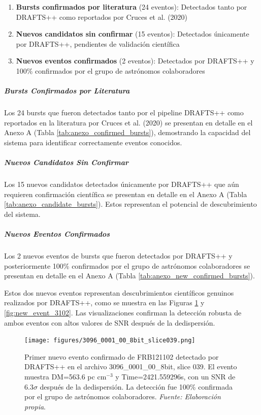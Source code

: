 \begin{enumerate}
    \item \textbf{Bursts confirmados por literatura} (24 eventos): Detectados tanto por DRAFTS++ como reportados por Cruces et al. (2020)
    \item \textbf{Nuevos candidatos sin confirmar} (15 eventos): Detectados únicamente por DRAFTS++, pendientes de validación científica
    \item \textbf{Nuevos eventos confirmados} (2 eventos): Detectados por DRAFTS++ y 100\% confirmados por el grupo de astrónomos colaboradores
\end{enumerate}

\subparagraph{Bursts Confirmados por Literatura}

Los 24 bursts que fueron detectados tanto por el pipeline DRAFTS++ como reportados en la literatura por Cruces et al. (2020) se presentan en detalle en el Anexo A (Tabla \ref{tab:anexo_confirmed_bursts}), demostrando la capacidad del sistema para identificar correctamente eventos conocidos.

\subparagraph{Nuevos Candidatos Sin Confirmar}

Los 15 nuevos candidatos detectados únicamente por DRAFTS++ que aún requieren confirmación científica se presentan en detalle en el Anexo A (Tabla \ref{tab:anexo_candidate_bursts}). Estos representan el potencial de descubrimiento del sistema.

\subparagraph{Nuevos Eventos Confirmados}

Los 2 nuevos eventos de bursts que fueron detectados por DRAFTS++ y posteriormente 100\% confirmados por el grupo de astrónomos colaboradores se presentan en detalle en el Anexo A (Tabla \ref{tab:anexo_new_confirmed_bursts}).

Estos dos nuevos eventos representan descubrimientos científicos genuinos realizados por DRAFTS++, como se muestra en las Figuras \ref{fig:new_event_3096} y \ref{fig:new_event_3102}. Las visualizaciones confirman la detección robusta de ambos eventos con altos valores de SNR después de la dedispersión.

\begin{figure}[H]
    \centering
    \texttt{[image: figures/3096\_0001\_00\_8bit\_slice039.png]}
    \caption[FRB121102: nuevo evento confirmado (3096\_...\_slice039)]{Primer nuevo evento confirmado de FRB121102 detectado por DRAFTS++ en el archivo 3096\_0001\_00\_8bit, slice 039. El evento muestra DM=563.6 pc cm$^{-3}$ y Time=2421.559296s, con un SNR de 6.3$\sigma$ después de la dedispersión. La detección fue 100\% confirmada por el grupo de astrónomos colaboradores. \textit{Fuente: Elaboración propia}.}
    \label{fig:new_event_3096}
\end{figure}

